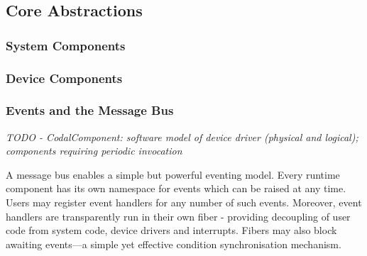 
\subsection{Core Abstractions}

\subsubsection{System Components}



\subsubsection{Device Components}



\subsubsection{Events and the Message Bus}

\emph{TODO - CodalComponent: software model of device driver (physical and logical); components requiring periodic invocation}

A message bus enables a simple but powerful eventing model. Every runtime component has its own namespace for events
which can be raised at any time. Users may register event handlers for any number of such events. Moreover, event handlers
are transparently run in their own fiber - providing decoupling of user code from system code, device drivers and interrupts.
Fibers may also block awaiting events---a simple yet effective condition synchronisation mechanism.

